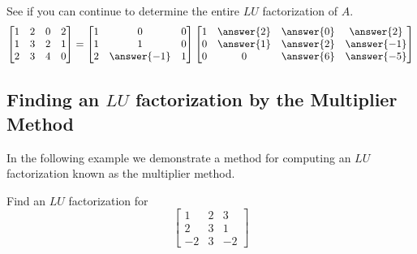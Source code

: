 \documentclass{ximera}
\begin{document}
See if you can continue to determine the entire $LU$
factorization of $A$.
\[
\begin{bmatrix}
1 & 2 & 0 & 2 \\
1 & 3 & 2 & 1 \\
2 & 3 & 4 & 0
\end{bmatrix}
=
\begin{bmatrix}
1 & 0 & 0 \\
1 & 1 & 0 \\
2 & \answer{-1} & 1
\end{bmatrix} 
\begin{bmatrix}
1 & \answer{2} & \answer{0} & \answer{2} \\
0 & \answer{1} & \answer{2} & \answer{-1} \\
0 & 0 & \answer{6} & \answer{-5}
\end{bmatrix}
\]

\subsection*{Finding an $LU$ factorization by the Multiplier Method}

In the following example we demonstrate a method for computing an $LU$ factorization known as the multiplier method.

\begin{example}\label{ex:multiplierLU}
Find an $LU$ factorization for
\[
\begin{bmatrix}
1 & 2 & 3 \\
2 & 3 & 1 \\
-2 & 3 & -2
\end{bmatrix} 
\]

\end{example}
\end{document}
